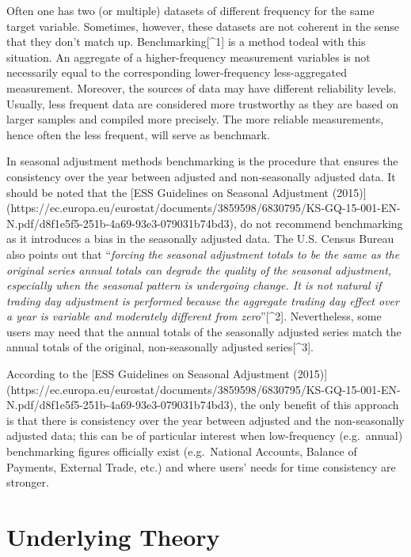 \documentclass[
  letterpaper,
  DIV=11,
  numbers=noendperiod]{scrreprt}
\begin{document}
Often one has two (or multiple) datasets of different frequency for the
same target variable. Sometimes, however, these datasets are not
coherent in the sense that they don't match up. Benchmarking{[}\^{}1{]}
is a method todeal with this situation. An aggregate of a
higher-frequency measurement variables is not necessarily equal to the
corresponding lower-frequency less-aggregated measurement. Moreover, the
sources of data may have different reliability levels. Usually, less
frequent data are considered more trustworthy as they are based on
larger samples and compiled more precisely. The more reliable
measurements, hence often the less frequent, will serve as benchmark.

In seasonal adjustment methods benchmarking is the procedure that
ensures the consistency over the year between adjusted and
non-seasonally adjusted data. It should be noted that the {[}ESS
Guidelines on Seasonal Adjustment (2015){]}
(https://ec.europa.eu/eurostat/documents/3859598/6830795/KS-GQ-15-001-EN-N.pdf/d8f1e5f5-251b-4a69-93e3-079031b74bd3),
do not recommend benchmarking as it introduces a bias in the seasonally
adjusted data. The U.S. Census Bureau also points out that
``\emph{forcing the seasonal adjustment totals to be the same as the
original series annual totals can degrade the quality of the seasonal
adjustment, especially when the seasonal pattern is undergoing change.
It is not natural if trading day adjustment is performed because the
aggregate trading day effect over a year is variable and moderately
different from zero}''{[}\^{}2{]}. Nevertheless, some users may need
that the annual totals of the seasonally adjusted series match the
annual totals of the original, non-seasonally adjusted
series{[}\^{}3{]}.

According to the {[}ESS Guidelines on Seasonal Adjustment (2015){]}
(https://ec.europa.eu/eurostat/documents/3859598/6830795/KS-GQ-15-001-EN-N.pdf/d8f1e5f5-251b-4a69-93e3-079031b74bd3),
the only benefit of this approach is that there is consistency over the
year between adjusted and the non-seasonally adjusted data; this can be
of particular interest when low-frequency (e.g.~annual) benchmarking
figures officially exist (e.g.~National Accounts, Balance of Payments,
External Trade, etc.) and where users' needs for time consistency are
stronger.

\hypertarget{underlying-theory-1}{%
\section{Underlying Theory}\label{underlying-theory-1}}
\end{document}
